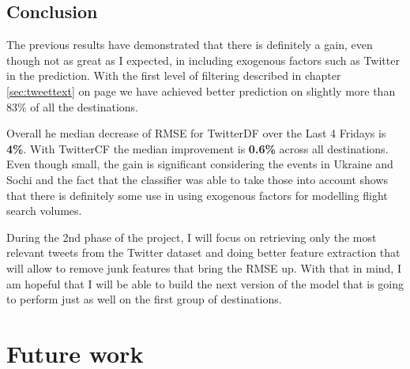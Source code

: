 \documentclass[minf,frontabs,twoside,singlespacing,parskip]{infthesis}
\begin{document}
%
\newpage
\section{Conclusion}

The previous results have demonstrated that there is definitely a gain, even though not as great as I expected, in including exogenous factors such as Twitter in the prediction. With the first level of filtering described in chapter \ref{sec:tweettext} on page \pageref{sec:tweettext} we have achieved better prediction on slightly more than 83\% of all the destinations.  


Overall he median decrease of RMSE for TwitterDF over the Last 4 Fridays is \textbf{4\%}. With TwitterCF the median improvement is \textbf{0.6\%} across all destinations. Even though small, the gain is significant considering the events in Ukraine and Sochi and the fact that the classifier was able to take those into account shows that there is definitely some use in using exogenous factors for modelling flight search volumes. 

During the 2nd phase of the project, I will focus on retrieving only the most relevant tweets from the Twitter dataset and doing better feature extraction that will allow to remove junk features that bring the RMSE up. With that in mind, I am hopeful that I will be able to build the next version of the model that is going to perform just as well on the first group of destinations. 


\chapter{Future work}
\label{chap:future-work}



\end{document}
